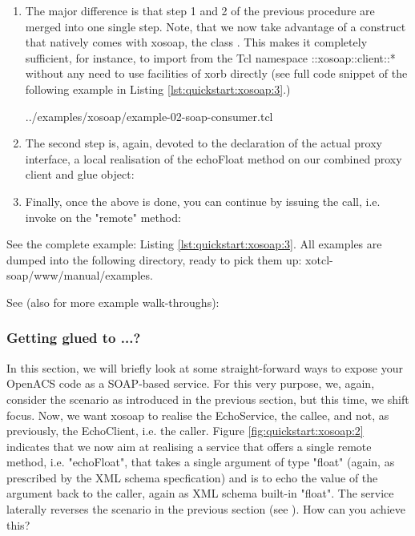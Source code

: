 \begin{enumerate}
\item The major difference is that step 1 and 2 of the previous procedure are merged into one single 
step. Note, that we now take advantage of a construct that natively comes with xosoap, the 
class . This makes it completely sufficient, for instance, to import from the Tcl 
namespace ::xosoap::client::* without any need to use facilities of xorb directly (see full code snippet of 
the following example in Listing \ref{lst:quickstart:xosoap:3}.)

{../examples/xosoap/example-02-soap-consumer.tcl}
\item The second step is, again, devoted to the declaration of the actual proxy interface, a local 
realisation of the echoFloat method on our combined proxy client and glue object:

\item Finally, once the above is done, you can continue by issuing the call, i.e. invoke on the "remote" 
method:

\end{enumerate}

 \begin{hints}
\item See the complete example: Listing \ref{lst:quickstart:xosoap:3}. All examples are dumped into the following directory, ready to pick them up: xotcl-soap/www/manual/examples.
\item See (also for more example walk-throughs): 
\end{hints}

  
  \subsubsection{Getting glued to ...?}
  In this section, we will briefly look at some straight-forward ways to expose your OpenACS code as a 
SOAP-based service. For this very purpose, we, again, consider the scenario as introduced in the 
previous section, but this time, we shift focus. Now, we want xosoap to realise the EchoService, the 
callee, and not, as previously, the EchoClient, i.e. the caller. Figure \ref{fig:quickstart:xosoap:2} indicates 
that we now aim at realising a service that offers a single remote method, i.e. "echoFloat", that takes a 
single argument of type "float" (again, as prescribed by the XML schema specfication) and is to echo the 
value of the argument back to the caller, again as XML schema built-in "float". The service laterally 
reverses the scenario in the previous section (see ). How can you 
achieve this?

